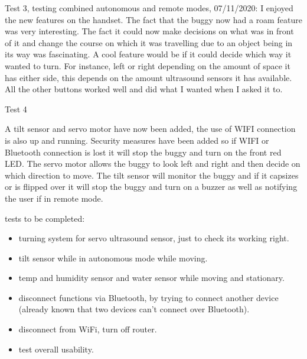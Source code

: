\documentclass[8pt, a4paper]{article}
\begin{document}
Test 3, testing combined autonomous and remote modes, 07/11/2020: I enjoyed the new features on the handset. The fact that the buggy now had a roam feature was very interesting. The fact it could now make decisions on what was in front of it and change the course on which it was travelling due to an object being in its way was fascinating. A cool feature would be if it could decide which way it wanted to turn. For instance, left or right depending on the amount of space it has either side, this depends on the amount ultrasound sensors it has available. All the other buttons worked well and did what I wanted when I asked it to. 

Test 4

A tilt sensor and servo motor have now been added, the use of WIFI connection is also up and running. Security measures have been added so if WIFI or Bluetooth connection is lost it will stop the buggy and turn on the front red LED. The servo motor allows the buggy to look left and right and then decide on which direction to move. The tilt sensor will monitor the buggy and if it capsizes or is flipped over it will stop the buggy and turn on a buzzer as well as notifying the user if in remote mode. 

tests to be completed:
\begin{itemize}
\item turning system for servo ultrasound sensor, just to check its working right.
\item tilt sensor while in autonomous mode while moving. 
\item temp and humidity sensor and water sensor while moving and stationary. 
\item disconnect functions via Bluetooth, by trying to connect another device (already known that two devices can’t connect over Bluetooth).
\item disconnect from WiFi, turn off router. 
\item test overall usability.
\end{itemize}
\end{document}
